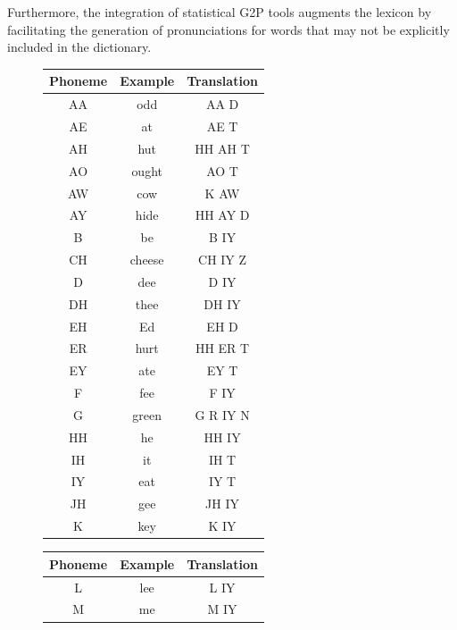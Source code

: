 Furthermore, the integration of statistical \ac{G2P} tools \cite{g2p} augments the lexicon by facilitating the generation of pronunciations for words that may not be explicitly included in the dictionary.



\begin{figure}
    \begin{minipage}[t]{0.5\textwidth}
        \centering
        \begin{tabular}{ccc}
            \hline
            Phoneme & Example & Translation \\
            \hline
            AA & odd & AA D \\
            AE & at & AE T \\
            AH & hut & HH AH T \\
            AO & ought & AO T \\
            AW & cow & K AW \\
            AY & hide & HH AY D \\
            B & be & B IY \\
            CH & cheese & CH IY Z \\
            D & dee & D IY \\
            DH & thee & DH IY \\
            EH & Ed & EH D \\
            ER & hurt & HH ER T \\
            EY & ate & EY T \\
            F & fee & F IY \\
            G & green & G R IY N \\
            HH & he & HH IY \\
            IH & it & IH T \\
            IY & eat & IY T \\
            JH & gee & JH IY \\
            K & key & K IY \\
            \hline
        \end{tabular}
    \end{minipage}%
    \begin{minipage}[t]{0.5\textwidth}
        \centering
        \begin{tabular}{ccc}
            \hline
            Phoneme & Example & Translation \\
            \hline
            L & lee & L IY \\
            M & me & M IY \\

\end{tabular}
\end{minipage}
\end{figure}
